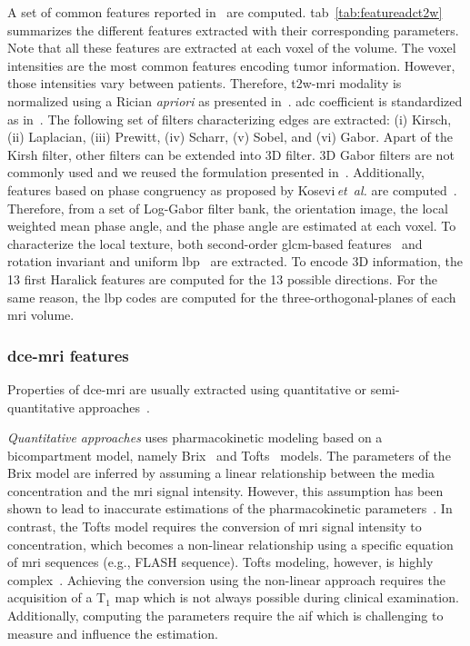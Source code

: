 \documentclass[final,3p,times,twocolumn]{elsarticle}
\begin{document}
A set of common features reported in~\cite{lemaitre2015computer} are
computed. \Acl{tab}~\ref{tab:featureadct2w} summarizes the different features
extracted with their corresponding parameters. Note that all these features are
extracted at each voxel of the volume. The voxel intensities are the most
common features encoding tumor information. However, those intensities vary
between patients. Therefore, \ac{t2w}-\ac{mri} modality is normalized using a
Rician \emph{apriori} as presented
in~\cite{lemaitre2016normalization}. \Ac{adc} coefficient is standardized as
in~\cite{Nyul1999}. The following set of filters characterizing edges are
extracted: (i) Kirsch, (ii) Laplacian, (iii) Prewitt, (iv) Scharr, (v) Sobel,
and (vi) Gabor. Apart of the Kirsh filter, other filters can be extended into
3D filter. 3D Gabor filters are not commonly used and we reused the formulation
presented in~\cite{wang2005face}. Additionally, features based on phase
congruency as proposed by Kosevi\,\emph{et~al.} are
computed~\cite{kovesi1999image}. Therefore, from a set of Log-Gabor filter
bank, the orientation image, the local weighted mean phase angle, and the phase
angle are estimated at each voxel. To characterize the local texture, both
second-order \ac{glcm}-based features~\cite{Haralick1973} and rotation
invariant and uniform \ac{lbp}~\cite{ojala2002multiresolution} are
extracted. To encode 3D information, the 13 first Haralick features are
computed for the 13 possible directions. For the same reason, the \ac{lbp}
codes are computed for the three-orthogonal-planes of each \ac{mri} volume.

\subsubsection{\acs*{dce}-\acs*{mri} features}\label{features:dce}

Properties of \ac{dce}-\ac{mri} are usually extracted using quantitative or
semi-quantitative approaches~\cite{lemaitre2015computer}.

\emph{Quantitative approaches} uses pharmacokinetic modeling based on a
bicompartment model, namely Brix~\cite{brix1991pharmacokinetic} and
Tofts~\cite{tofts1995quantitative} models. The parameters of the Brix model
are inferred by assuming a linear relationship between the media concentration
and the \ac{mri} signal intensity. However, this assumption has been shown to
lead to inaccurate estimations of the pharmacokinetic
parameters~\cite{heilmann2006determination}. In contrast, the Tofts model
requires the conversion of \ac{mri} signal intensity to concentration, which
becomes a non-linear relationship using a specific equation of \ac{mri}
sequences (e.g., FLASH sequence). Tofts modeling, however, is highly
complex~\cite{gliozzi2011phenomenological}. Achieving the conversion using the
non-linear approach requires the acquisition of a T$_1$ map which is not always
possible during clinical examination. Additionally, computing the parameters
require the \ac{aif} which is challenging to measure and influence the estimation.
\end{document}
